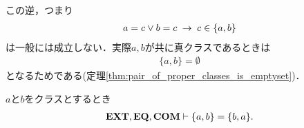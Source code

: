 	この逆，つまり
	\begin{align}
		a = c \vee b = c \hspace{0.25em}\rightarrow\hspace{0.25em} c \in \{a,b\}
	\end{align}
	は一般には成立しない．実際$a,b$が共に真クラスであるときは
	\begin{align}
		\{a,b\} = \emptyset
	\end{align}
	となるためである(定理\ref{thm:pair_of_proper_classes_is_emptyset})．
	
	\begin{screen}
		\begin{thm}[表示の順番を入れ替えても対は等しい]
		\label{thm:commutative_law_of_pairs}
			$a$と$b$をクラスとするとき
			\begin{align}
				\mbox{{\bf EXT}},\mbox{{\bf EQ}},\mbox{\bf COM} \vdash \{a,b\} = \{b,a\}.
			\end{align}
		\end{thm}
	\end{screen}
	
